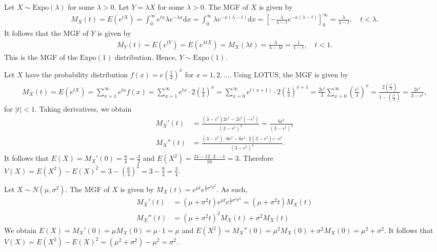 \begin{Solution}{1.17}
			Let $X \sim \text{Expo}(\lambda)$ for some $\lambda > 0$. Let $Y = \lambda X$ for some $\lambda > 0$. The MGF of $X$ is given by
			\begin{align*}
				M_X(t) = E(e^{tX}) = \int_0^{\infty} e^{tx} \lambda e^{-\lambda x} \mathrm{d}x = \int_0^{\infty} \lambda e^{-x(\lambda - t)} \mathrm{d}x = \left[- \frac{\lambda}{\lambda - t} e^{-x(\lambda - t)}\right]_0^{\infty} = \frac{\lambda}{\lambda - t}, \quad t < \lambda.
			\end{align*}
			It follows that the MGF of $Y$ is given by
			\begin{align*}
				M_Y(t) = E(e^{tY}) = E(e^{\lambda t X}) = M_X(\lambda t) =  \frac{\lambda}{\lambda - \lambda t} = \frac{1}{1 - t}, \quad t < 1.
			\end{align*}
			This is the MGF of the $\text{Expo}(1)$ distribution. Hence, $Y \sim \text{Expo}(1)$.
		
\end{Solution}
\begin{Solution}{1.18}
			Let $X$ have the probability distribution $f(x) = e \left(\frac{1}{3}\right)^x$ for $x = 1, 2, \ldots$. Using LOTUS, the MGF is given by
		\begin{align*}
			M_X(t) = E(e^{tX}) = \sum_{x=1}^{\infty} e^{tx} f(x) = \sum_{x=1}^{\infty} e^{tx} \cdot 2 \left(\frac{1}{3}\right)^x = \sum_{x=0}^{\infty} e^{t(x+1)} \cdot 2 \left(\frac{1}{3}\right)^{x+1} = \frac{2 e^t}{3} \sum_{x=0}^{\infty} \left(\frac{e^t}{3}\right)^x = \frac{2 \left(\frac{e^t}{3}\right)}{1 - \left(\frac{e^t}{3}\right)} = \frac{2e^t}{3 - e^t},
		\end{align*}
		for $|t|<1$. Taking derivatives, we obtain
		\begin{align*}
			M_X'(t) & = \frac{(3 - e^t) 2e^t - 2e^t (-e^t)}{(3 - e^t)^2} = \frac{6e^t}{(3 - e^t)^2} \\
			M_X''(t) & = \frac{(3 - e^t) \cdot 6e^t - 6e^t \cdot 2(3 - e^t)(-e^t}{(3 - e^t)^4}.
		\end{align*}
		It follows that $E(X) = M_X'(0) = \frac{6}{4} = \frac{3}{2}$ and $E(X^2) = \frac{24 - 12 \cdot 2 \cdot -1}{16} = 3$. Therefore $V(X) = E(X^2) - E(X)^2 = 3 - \left(\frac{6}{4}\right)^2 = 3 - \frac{9}{4} = \frac{3}{4}$.
		
\end{Solution}
\begin{Solution}{1.19}
			Let $X \sim N(\mu, \sigma^2)$. The MGF of $X$ is given by $M_X(t) = e^{\mu t} e^{\frac{1}{2} \sigma^2 t^2}$. As such,
			\begin{align*}
				M_X'(t) & = (\mu + \sigma^2 t) e^{\mu t} e^{\frac{1}{2} \sigma^2 t^2} = (\mu + \sigma^2 t) M_X(t) \\
				M_X''(t) & = (\mu + \sigma^2 t)^2 M_X(t) + \sigma^2 M_X(t)
			\end{align*}
			We obtain $E(X) = M_X'(0) = \mu M_X(0) = \mu \cdot 1 = \mu$ and $E(X^2) = M_X''(0) = \mu^2 M_X(0) + \sigma^2 M_X(0) = \mu^2 + \sigma^2$. It follows that $V(X) = E(X^2) - E(X)^2 = (\mu^2 + \sigma^2) - \mu^2 = \sigma^2$.
		
\end{Solution}
